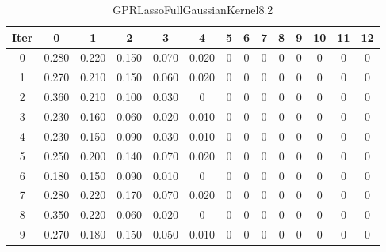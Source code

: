 \begin{table}
	\begin{center}
		\begin{tabular}{|c|c|c|c|c|c|c|c|c|c|c|c|c|c|}
			\hline
			Iter & 0 & 1 & 2 & 3 & 4 & 5 & 6 & 7 & 8 & 9 & 10 & 11 & 12 \\
			\hline
			0 & 0.280 & 0.220 & 0.150 & 0.070 & 0.020 & 0 & 0 & 0 & 0 & 0 & 0 & 0 & 0 \\
			\hline
			1 & 0.270 & 0.210 & 0.150 & 0.060 & 0.020 & 0 & 0 & 0 & 0 & 0 & 0 & 0 & 0 \\
			\hline
			2 & 0.360 & 0.210 & 0.100 & 0.030 & 0 & 0 & 0 & 0 & 0 & 0 & 0 & 0 & 0 \\
			\hline
			3 & 0.230 & 0.160 & 0.060 & 0.020 & 0.010 & 0 & 0 & 0 & 0 & 0 & 0 & 0 & 0 \\
			\hline
			4 & 0.230 & 0.150 & 0.090 & 0.030 & 0.010 & 0 & 0 & 0 & 0 & 0 & 0 & 0 & 0 \\
			\hline
			5 & 0.250 & 0.200 & 0.140 & 0.070 & 0.020 & 0 & 0 & 0 & 0 & 0 & 0 & 0 & 0 \\
			\hline
			6 & 0.180 & 0.150 & 0.090 & 0.010 & 0 & 0 & 0 & 0 & 0 & 0 & 0 & 0 & 0 \\
			\hline
			7 & 0.280 & 0.220 & 0.170 & 0.070 & 0.020 & 0 & 0 & 0 & 0 & 0 & 0 & 0 & 0 \\
			\hline
			8 & 0.350 & 0.220 & 0.060 & 0.020 & 0 & 0 & 0 & 0 & 0 & 0 & 0 & 0 & 0 \\
			\hline
			9 & 0.270 & 0.180 & 0.150 & 0.050 & 0.010 & 0 & 0 & 0 & 0 & 0 & 0 & 0 & 0 \\
			\hline
		\end{tabular}
	\end{center}
	\caption{GPRLassoFullGaussianKernel8.2}
\end{table}